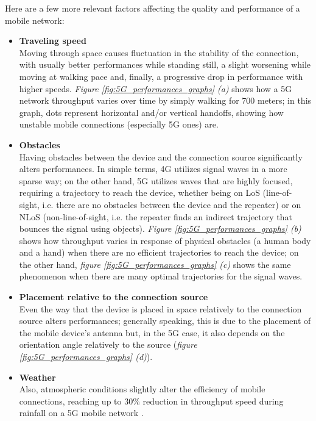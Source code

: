 Here are a few more relevant factors affecting the quality and performance of a mobile network:
\begin{itemize}
    \item \textbf{Traveling speed}\\
    Moving through space causes fluctuation in the stability of the connection, with usually better performances while standing still, a slight worsening while moving at walking pace and, finally, a progressive drop in performance with higher speeds. \textit{Figure \ref{fig:5G_performances_graphs} (a)} shows how a 5G network throughput varies over time by simply walking for 700 meters; in this graph, dots represent horizontal and/or vertical handoffs, showing how unstable mobile connections (especially 5G ones) are.
    \item \textbf{Obstacles}\\
    Having obstacles between the device and the connection source significantly alters performances. In simple terms, 4G utilizes signal waves in a more sparse way; on the other hand, 5G utilizes waves that are highly focused, requiring a trajectory to reach the device, whether being on LoS (line-of-sight, i.e. there are no obstacles between the device and the repeater) or on NLoS (non-line-of-sight, i.e. the repeater finds an indirect trajectory that bounces the signal using objects). \textit{Figure \ref{fig:5G_performances_graphs} (b)} shows how throughput varies in response of physical obstacles (a human body and a hand) when there are no efficient trajectories to reach the device; on the other hand, \textit{figure \ref{fig:5G_performances_graphs} (c)} shows the same phenomenon when there are many optimal trajectories for the signal waves.
    \item \textbf{Placement relative to the connection source}\\
    Even the way that the device is placed in space relatively to the connection source alters performances; generally speaking, this is due to the placement of the mobile device's antenna but, in the 5G case, it also depends on the orientation angle relatively to the source (\textit{figure \ref{fig:5G_performances_graphs} (d)}).
    \item \textbf{Weather}\\
    Also, atmospheric conditions slightly alter the efficiency of mobile connections, reaching up to 30\% reduction in throughput speed during rainfall on a 5G mobile network \cite{5g_performances}.
\end{itemize}

